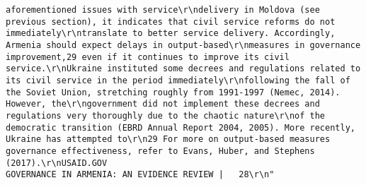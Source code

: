 \documentclass[
]{article}
\begin{document}
\begin{verbatim}
aforementioned issues with service\r\ndelivery in Moldova (see previous section), it indicates that civil service reforms do not immediately\r\ntranslate to better service delivery. Accordingly, Armenia should expect delays in output-based\r\nmeasures in governance improvement,29 even if it continues to improve its civil service.\r\nUkraine instituted some decrees and regulations related to its civil service in the period immediately\r\nfollowing the fall of the Soviet Union, stretching roughly from 1991-1997 (Nemec, 2014). However, the\r\ngovernment did not implement these decrees and regulations very thoroughly due to the chaotic nature\r\nof the democratic transition (EBRD Annual Report 2004, 2005). More recently, Ukraine has attempted to\r\n29 For more on output-based measures governance effectiveness, refer to Evans, Huber, and Stephens (2017).\r\nUSAID.GOV                                                        GOVERNANCE IN ARMENIA: AN EVIDENCE REVIEW |   28\r\n"                                                                                                                                                                                                                                                                                                                                                                                                                                                                                                                                                                                                                                                                                                                                                               

\end{verbatim}
\end{document}
